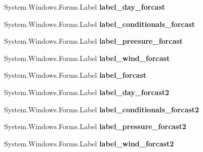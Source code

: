 \begin{DoxyCompactItemize}
\mbox{\label{class_pogodynka__w57003_1_1panel__glony_a91d81a76eb1b0311c69f6af39e433387}} 
System.\+Windows.\+Forms.\+Label {\bfseries label\+\_\+day\+\_\+forcast}
\item 
\mbox{\label{class_pogodynka__w57003_1_1panel__glony_a78e63c3bc774c34731a6c686ae04d37b}} 
System.\+Windows.\+Forms.\+Label {\bfseries label\+\_\+conditionals\+\_\+forcast}
\item 
\mbox{\label{class_pogodynka__w57003_1_1panel__glony_a7620ba32225d2b0ad545af3738564e2c}} 
System.\+Windows.\+Forms.\+Label {\bfseries label\+\_\+preesure\+\_\+forcast}
\item 
\mbox{\label{class_pogodynka__w57003_1_1panel__glony_ad8a6982ab27582aacd69efdc75f763ec}} 
System.\+Windows.\+Forms.\+Label {\bfseries label\+\_\+wind\+\_\+forcast}
\item 
\mbox{\label{class_pogodynka__w57003_1_1panel__glony_a8dbf994aeef45fc28561ceb827f0ce69}} 
System.\+Windows.\+Forms.\+Label {\bfseries label\+\_\+forcast}
\item 
\mbox{\label{class_pogodynka__w57003_1_1panel__glony_a8a122c44cabb0ad9fb6e91d4fe712c6a}} 
System.\+Windows.\+Forms.\+Label {\bfseries label\+\_\+day\+\_\+forcast2}
\item 
\mbox{\label{class_pogodynka__w57003_1_1panel__glony_a7a1066a568f5522b57e6324a048883bc}} 
System.\+Windows.\+Forms.\+Label {\bfseries label\+\_\+conditionals\+\_\+forcast2}
\item 
\mbox{\label{class_pogodynka__w57003_1_1panel__glony_a8cde67f766b24f62c8c4b42369ff2917}} 
System.\+Windows.\+Forms.\+Label {\bfseries label\+\_\+pressure\+\_\+forcast2}
\item 
\mbox{\label{class_pogodynka__w57003_1_1panel__glony_aef67dde1d2d88770e02067565058d836}} 
System.\+Windows.\+Forms.\+Label {\bfseries label\+\_\+wind\+\_\+forcast2}

\end{DoxyCompactItemize}
